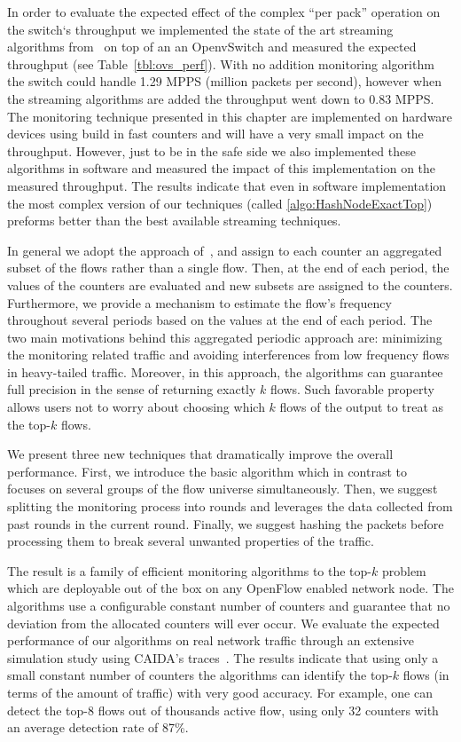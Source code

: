 In order to evaluate the expected effect of the complex ``per pack'' operation on the switch`s throughput we implemented the state of the art streaming algorithms from~\cite{Ben-Basat2017} on top of an an OpenvSwitch and measured the expected throughput (see Table~\ref{tbl:ovs_perf}).  With no addition monitoring algorithm the switch could handle 1.29 MPPS (million packets per second), however when the streaming algorithms are added the throughput went down to 0.83 MPPS.  The monitoring technique presented in this chapter are implemented on hardware devices using build in fast counters and will have a very small impact on the throughput.  However, just to be in the safe side we also implemented these algorithms in software and measured the impact of this implementation on the measured throughput. The results indicate that even in software implementation the most complex version of our techniques (called \ref{algo:HashNodeExactTop}) preforms better than the best available streaming techniques. 

In general we adopt the approach of~\cite{Moraney2016}, and assign to each counter an aggregated subset of the flows rather than a single flow. Then, at the end of each period, the values of the counters are evaluated and new subsets are assigned to the counters. Furthermore, we provide a mechanism to estimate the flow's frequency throughout several periods based on the values at the end of each period. The two main motivations behind this aggregated periodic approach are: minimizing the monitoring related traffic and avoiding interferences from low frequency flows in heavy-tailed traffic. Moreover, in this approach, the algorithms can guarantee full precision in the sense of returning exactly $k$ flows. Such favorable property allows users not to worry about choosing which $k$ flows of the output to treat as the top-$k$ flows.

We present three new techniques that dramatically improve the overall performance. 
First, we introduce the basic algorithm which in contrast to~\cite{Moraney2016} focuses on several groups of the flow universe simultaneously.
Then, we suggest splitting the monitoring process into rounds and leverages the data collected from past rounds in the current round.
Finally, we suggest hashing the packets before processing them to break several unwanted properties of the traffic.

The result is a family of efficient monitoring algorithms to the top-$k$ problem which are deployable out of the box on any OpenFlow enabled network node. The algorithms use a configurable constant number of counters and guarantee that no deviation from the allocated counters will ever occur.  We evaluate the expected performance of our algorithms on real network traffic through an extensive simulation study using CAIDA’s traces~\cite{CAIDA14,CAIDA15,CAIDA2016}.  The results indicate that using only a small constant number of counters the algorithms can identify the top-$k$ flows (in terms of the amount of traffic) with very good accuracy.  For example, one can detect the top-8 flows out of thousands active flow, using only 32 counters with an average detection rate of 87\%. 

